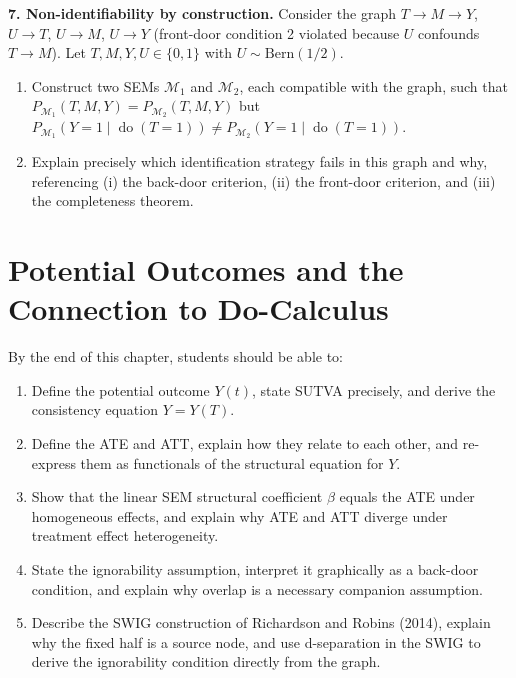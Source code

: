 \documentclass[
  a4paper,
]{book}
\providecommand{\tightlist}{%
  \setlength{\itemsep}{0pt}\setlength{\parskip}{0pt}}
\newcommand{\doop}{\operatorname{do}}
\begin{document}
\textbf{7. Non-identifiability by construction.} Consider the graph
\(T \to M \to Y\), \(U \to T\), \(U \to M\), \(U \to Y\) (front-door
condition 2 violated because \(U\) confounds \(T \to M\)). Let
\(T, M, Y, U \in \{0,1\}\) with \(U \sim \mathrm{Bern}(1/2)\).

\begin{enumerate}
\def\labelenumi{(\alph{enumi})}
\tightlist
\item
  Construct two SEMs \(\mathcal{M}_1\) and \(\mathcal{M}_2\), each
  compatible with the graph, such that
  \(P_{\mathcal{M}_1}(T, M, Y) = P_{\mathcal{M}_2}(T, M, Y)\) but
  \(P_{\mathcal{M}_1}(Y{=}1 \mid \doop(T{=}1)) \ne P_{\mathcal{M}_2}(Y{=}1 \mid \doop(T{=}1))\).
\item
  Explain precisely which identification strategy fails in this graph
  and why, referencing (i) the back-door criterion, (ii) the front-door
  criterion, and (iii) the completeness theorem.
\end{enumerate}


\chapter{Potential Outcomes and the Connection to
Do-Calculus}\label{potential-outcomes-and-the-connection-to-do-calculus}

\begin{tcolorbox}[enhanced jigsaw, arc=.35mm, bottomrule=.15mm, bottomtitle=1mm, breakable, colback=white, colbacktitle=quarto-callout-note-color!10!white, colframe=quarto-callout-note-color-frame, coltitle=black, left=2mm, leftrule=.75mm, opacityback=0, opacitybacktitle=0.6, rightrule=.15mm, title={Learning Objectives}, titlerule=0mm, toprule=.15mm, toptitle=1mm]

By the end of this chapter, students should be able to:

\begin{enumerate}
\def\labelenumi{\arabic{enumi}.}
\tightlist
\item
  Define the potential outcome \(Y(t)\), state SUTVA precisely, and
  derive the consistency equation \(Y = Y(T)\).
\item
  Define the ATE and ATT, explain how they relate to each other, and
  re-express them as functionals of the structural equation for \(Y\).
\item
  Show that the linear SEM structural coefficient \(\beta\) equals the
  ATE under homogeneous effects, and explain why ATE and ATT diverge
  under treatment effect heterogeneity.
\item
  State the ignorability assumption, interpret it graphically as a
  back-door condition, and explain why overlap is a necessary companion
  assumption.
\item
  Describe the SWIG construction of Richardson and Robins (2014),
  explain why the fixed half is a source node, and use d-separation in
  the SWIG to derive the ignorability condition directly from the graph.
\end{enumerate}

\end{tcolorbox}
\end{document}
